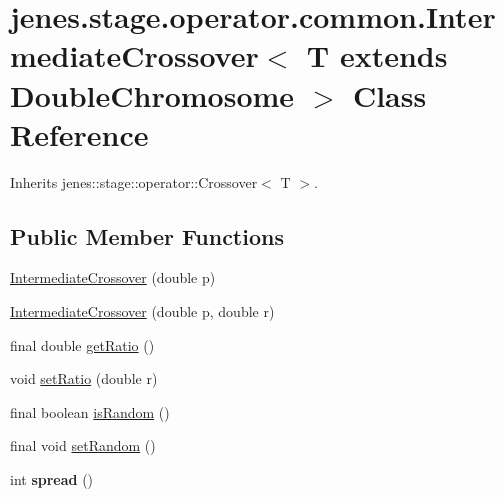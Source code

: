 \hypertarget{classjenes_1_1stage_1_1operator_1_1common_1_1_intermediate_crossover_3_01_t_01extends_01_double_chromosome_01_4}{
\section{jenes.stage.operator.common.IntermediateCrossover$<$ T extends DoubleChromosome $>$ Class Reference}
\label{classjenes_1_1stage_1_1operator_1_1common_1_1_intermediate_crossover_3_01_t_01extends_01_double_chromosome_01_4}
}
Inherits jenes::stage::operator::Crossover$<$ T $>$.

\subsection*{Public Member Functions}
\begin{CompactItemize}
\item 
\hyperlink{classjenes_1_1stage_1_1operator_1_1common_1_1_intermediate_crossover_3_01_t_01extends_01_double_chromosome_01_4_79954756cd6cd0ffc58cd4dfbee77ca3}{IntermediateCrossover} (double p)
\item 
\hyperlink{classjenes_1_1stage_1_1operator_1_1common_1_1_intermediate_crossover_3_01_t_01extends_01_double_chromosome_01_4_1e108f61a2e8e654e65162ef8833441f}{IntermediateCrossover} (double p, double r)
\item 
final double \hyperlink{classjenes_1_1stage_1_1operator_1_1common_1_1_intermediate_crossover_3_01_t_01extends_01_double_chromosome_01_4_5b3f99723d401833db13476b27072985}{getRatio} ()
\item 
void \hyperlink{classjenes_1_1stage_1_1operator_1_1common_1_1_intermediate_crossover_3_01_t_01extends_01_double_chromosome_01_4_1ed8c3472bcf1d00bebcb5f5e4f4988a}{setRatio} (double r)
\item 
final boolean \hyperlink{classjenes_1_1stage_1_1operator_1_1common_1_1_intermediate_crossover_3_01_t_01extends_01_double_chromosome_01_4_aed91a2488a595ef3033be9b87f7a6d1}{isRandom} ()
\item 
final void \hyperlink{classjenes_1_1stage_1_1operator_1_1common_1_1_intermediate_crossover_3_01_t_01extends_01_double_chromosome_01_4_7e3eb40cb2a7db9c3a80c98547cce253}{setRandom} ()
\item 
\hypertarget{classjenes_1_1stage_1_1operator_1_1common_1_1_intermediate_crossover_3_01_t_01extends_01_double_chromosome_01_4_4007c5dca65a48c2ea6dfbcc2372a0b2}{
int \textbf{spread} ()}
\label{classjenes_1_1stage_1_1operator_1_1common_1_1_intermediate_crossover_3_01_t_01extends_01_double_chromosome_01_4_4007c5dca65a48c2ea6dfbcc2372a0b2}

\end{CompactItemize}
